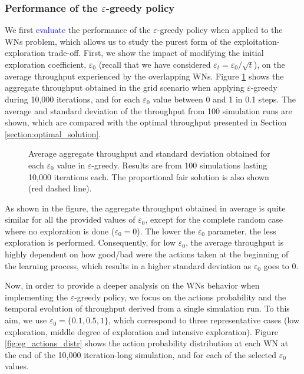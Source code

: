 \documentclass[preprint,12pt]{elsarticle}
\newcommand{\francesc}[1]{\textcolor{blue}{#1}}
\begin{document}
\subsubsection{Performance of the $\varepsilon$-greedy policy}
\label{section:egreedy_study}	
We first \francesc{evaluate} the performance of the $\varepsilon$-greedy policy when applied to the WNs problem, which allows us to study the purest form of the exploitation-exploration trade-off. First, we show the impact of modifying the initial exploration coefficient, $\varepsilon_0$ (recall that we have considered $\varepsilon_t = \varepsilon_0 / \sqrt{t}$), on the average throughput experienced by the overlapping WNs. Figure \ref{fig:egreedy_tuning_parameters} shows the aggregate throughput obtained in the grid scenario when applying $\varepsilon$-greedy during 10,000 iterations, and for each $\varepsilon_0$ value between 0 and 1 in 0.1 steps. The average and standard deviation of the throughput from 100 simulation runs are shown, which are compared with the optimal throughput presented in Section \ref{section:optimal_solution}.
\begin{figure}[t!]
	\centering							
	\caption{Average aggregate throughput and standard deviation obtained for each $\varepsilon_0$ value in $\varepsilon$-greedy. Results are from 100 simulations lasting 10,000 iterations each. The proportional fair solution is also shown (red dashed line).}
	\label{fig:egreedy_tuning_parameters}
\end{figure}		
As shown in the figure, the aggregate throughput obtained in average is quite similar for all the provided values of $\varepsilon_0$, except for the complete random case where no exploration is done ($\varepsilon_0 = 0$). The lower the $\varepsilon_0$ parameter, the less exploration is performed. Consequently, for low $\varepsilon_0$, the average throughput is highly dependent on how good/bad were the actions taken at the beginning of the learning process, which results in a higher standard deviation as $\varepsilon_0$ goes to 0.

Now, in order to provide a deeper analysis on the WNs behavior when implementing the $\varepsilon$-greedy policy, we focus on the actions probability and the temporal evolution of throughput derived from a single simulation run. To this aim, we use $\varepsilon_0 = \{0.1, 0.5, 1\}$, which correspond to three representative cases (low exploration, middle degree of exploration and intensive exploration). Figure \ref{fig:eg_actions_distr} shows the action probability distribution at each WN at the end of the 10,000 iteration-long simulation, and for each of the selected $\varepsilon_0$ values. 
\end{document}
